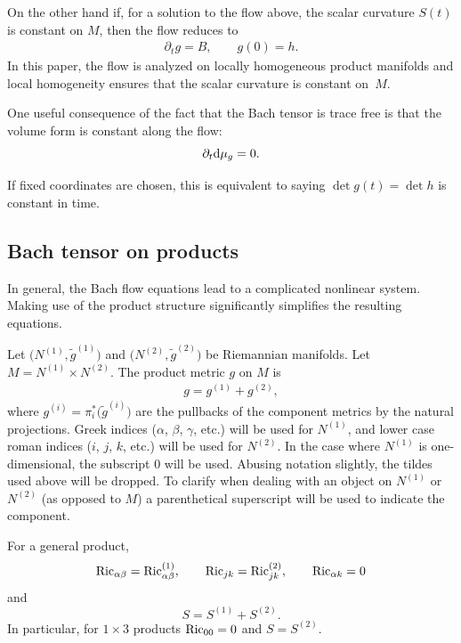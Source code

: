 \documentclass[pdftex]{sigma}
\numberwithin{equation}{section}
\newcommand{\dvar}[1]{\partial_{#1}} %
\begin{document}
On the other hand if, for a solution to the flow above, the scalar curvature $S(t)$ is constant on $M$, then the flow reduces to
\begin{gather} \label{bachfloweqn}
\dvar{t} g = B, \qquad
g(0) = h.
\end{gather}
In this paper, the flow is analyzed on locally homogeneous product manifolds and local homogeneity ensures that the scalar curvature is constant on~$M$.

One useful consequence of the fact that the Bach tensor is trace free is that the volume form is constant along the flow:
\[
\dvar{t}{\rm d} \mu_g = 0.
\]

If fixed coordinates are chosen, this is equivalent to saying $\det g(t) = \det h$ is constant in time.

\subsection{Bach tensor on products}

In general, the Bach flow equations lead to a complicated nonlinear system. Making use of the product structure significantly simplifies the resulting equations.

Let $\big(N^{(1)}, \tilde{g}^{(1)}\big)$ and $\big(N^{(2)}, \tilde{g}^{(2)}\big)$ be Riemannian manifolds. Let $M = N^{(1)} \times N^{(2)}$. The product metric $g$ on $M$ is
\begin{gather*}
g = g^{(1)} + g^{(2)},
\end{gather*}
where $g^{(i)}= \pi_i^*\big(\tilde{g}^{(i)}\big)$ are the pullbacks of the component metrics by the natural projections. Greek indices ($\alpha$, $\beta$, $\gamma$, etc.) will be used for $N^{(1)}$, and lower case roman indices ($i$, $j$, $k$, etc.) will be used for $N^{(2)}$. In the case where $N^{(1)}$ is one-dimensional, the subscript $0$ will be used. Abusing notation slightly, the tildes used above will be dropped. To clarify when dealing with an object on $N^{(1)}$ or $N^{(2)}$ (as opposed to $M$) a parenthetical superscript will be used to indicate the component.

For a general product,
\begin{gather*}
{\rm Ric}_{\alpha \beta} = {\rm Ric}^{(1)}_{\alpha \beta},\qquad
{\rm Ric}_{jk} = {\rm Ric}^{(2)}_{jk},\qquad
{\rm Ric}_{\alpha k} = 0
\end{gather*}
and
\[
S = S^{(1)} + S^{(2)}.
\]
In particular, for $1 \times 3$ products ${\rm Ric}_{00} = 0$ and $S = S^{(2)}$.
\end{document}

